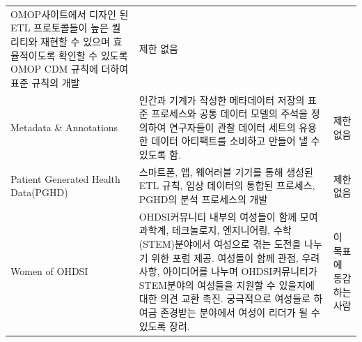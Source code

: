 \documentclass[11pt]{book}
\theoremstyle{definition}
\theoremstyle{definition}
\theoremstyle{definition}
\theoremstyle{remark}
\begin{document}
\begin{longtable}[]{@{}lll@{}}
\begin{minipage}[t]{0.30\columnwidth}
OMOP사이트에서 디자인 된 ETL 프로토콜들이 높은 퀄리티와 재현할 수 있으며
효율적이도록 확인할 수 있도록 OMOP CDM 규칙에 더하여 표준 규칙의
개발\strut
\end{minipage} & \begin{minipage}[t]{0.15\columnwidth}\raggedright\strut
제한 없음\strut
\end{minipage}\tabularnewline
\begin{minipage}[t]{0.11\columnwidth}\raggedright\strut
Metadata \& Annotations\strut
\end{minipage} & \begin{minipage}[t]{0.30\columnwidth}\raggedright\strut
인간과 기계가 작성한 메타데이터 저장의 표준 프로세스와 공통 데이터
모델의 주석을 정의하여 연구자들이 관찰 데이터 세트의 유용한 데이터
아티팩트를 소비하고 만들어 낼 수 있도록 함.\strut
\end{minipage} & \begin{minipage}[t]{0.15\columnwidth}\raggedright\strut
제한 없음\strut
\end{minipage}\tabularnewline
\begin{minipage}[t]{0.11\columnwidth}\raggedright\strut
Patient Generated Health Data(PGHD)\strut
\end{minipage} & \begin{minipage}[t]{0.30\columnwidth}\raggedright\strut
스마트폰, 앱, 웨어러블 기기를 통해 생성된 ETL 규칙, 임상 데이터의 통합된
프로세스, PGHD의 분석 프로세스의 개발\strut
\end{minipage} & \begin{minipage}[t]{0.15\columnwidth}\raggedright\strut
제한 없음\strut
\end{minipage}\tabularnewline
\begin{minipage}[t]{0.11\columnwidth}\raggedright\strut
Women of OHDSI\strut
\end{minipage} & \begin{minipage}[t]{0.30\columnwidth}\raggedright\strut
OHDSI커뮤니티 내부의 여성들이 함께 모여 과학계, 테크놀로지, 엔지니어링,
수학 (STEM)분야에서 여성으로 겪는 도전을 나누기 위한 포럼 제공. 여성들이
함께 관점, 우려 사항, 아이디어를 나누며 OHDSI커뮤니티가 STEM분야의
여성들을 지원할 수 있을지에 대한 의견 교환 촉진. 궁극적으로 여성들로
하여금 존경받는 분야에서 여성이 리더가 될 수 있도록 장려.\strut
\end{minipage} & \begin{minipage}[t]{0.15\columnwidth}\raggedright\strut
이 목표에 동감하는 사람\strut
\end{minipage}\tabularnewline

\end{longtable}
\end{document}
